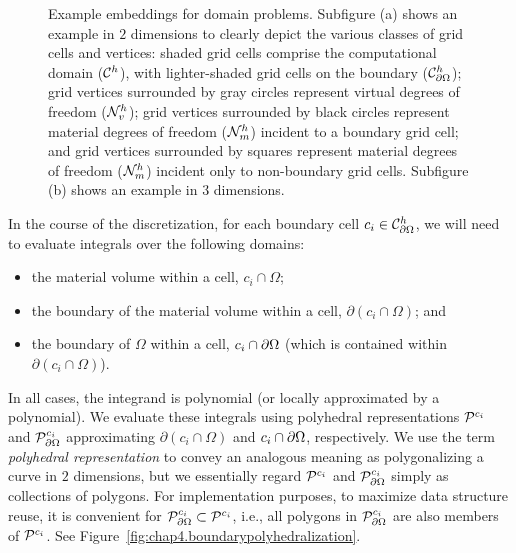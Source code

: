 \setlength{\figureheight}{0.50\textwidth}
\begin{figure}[htb]
\centering
{}
\caption{Example embeddings for domain problems. Subfigure (a) shows an example in $2$ dimensions to clearly depict the various classes of grid cells and vertices: shaded grid cells comprise the computational domain ($\mathcal{C}^h$), with lighter-shaded grid cells on the boundary ($\mathcal{C}_{\partial\Omega}^h$); grid vertices surrounded by gray circles represent virtual degrees of freedom ($\mathcal{N}^h_v$); grid vertices surrounded by black circles represent material degrees of freedom ($\mathcal{N}^h_m$) incident to a boundary grid cell; and grid vertices surrounded by squares represent material degrees of freedom ($\mathcal{N}^h_m$) incident only to non-boundary grid cells. Subfigure (b) shows an example in $3$ dimensions.}
\label{fig:chap4.embedding.domain}
\end{figure}

In the course of the discretization, for each boundary cell $c_i \in \mathcal{C}_{\partial\Omega}^h$, we will need to evaluate integrals over the following domains:
\begin{itemize}
\item the material volume within a cell, $c_i \cap \Omega$;
\item the boundary of the material volume within a cell, $\partial(c_i \cap \Omega)$; and
\item the boundary of $\Omega$ within a cell, $c_i \cap \partial\Omega$ (which is contained within $\partial(c_i \cap \Omega)$).
\end{itemize}
In all cases, the integrand is polynomial (or locally approximated by a polynomial). We evaluate these integrals using polyhedral representations $\mathcal{P}^{c_i}$ and $\mathcal{P}_{\partial\Omega}^{c_i}$ approximating $\partial(c_i \cap \Omega)$ and $c_i \cap \partial\Omega$, respectively. We use the term \emph{polyhedral representation} to convey an analogous meaning as polygonalizing a curve in $2$ dimensions, but we essentially regard $\mathcal{P}^{c_i}$ and $\mathcal{P}_{\partial\Omega}^{c_i}$ simply as collections of polygons. For implementation purposes, to maximize data structure reuse, it is convenient for $\mathcal{P}_{\partial\Omega}^{c_i} \subset \mathcal{P}^{c_i}$, i.e., all polygons in $\mathcal{P}_{\partial\Omega}^{c_i}$ are also members of $\mathcal{P}^{c_i}$. See Figure~\ref{fig:chap4.boundarypolyhedralization}.

